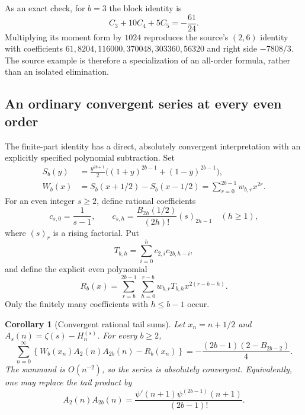 \documentclass[11pt,a4paper]{article}
\numberwithin{equation}{section}
\theoremstyle{plain}
\newtheorem{corollary}[theorem]{Corollary}
\theoremstyle{definition}
\theoremstyle{remark}
\begin{document}
As an exact check, for $b=3$ the block identity is
\[
 C_3+10C_4+5C_5=-\frac{61}{24}.
\]
Multiplying its moment form by $1024$ reproduces the source's
$(2,6)$ identity with coefficients
$61,8204,116000,370048,303360,56320$ and right side $-7808/3$.
The source example is therefore a specialization of an all-order
formula, rather than an isolated elimination.

\subsection{An ordinary convergent series at every even order}

The finite-part identity has a direct, absolutely convergent
interpretation with an explicitly specified polynomial subtraction.
Set
\begin{align}
 S_b(y)&=\frac{y^{2b+1}}2
       \bigl((1+y)^{2b-1}+(1-y)^{2b-1}\bigr),
       \label{eq:S-polynomial-two}\\
 W_b(x)&=S_b(x+1/2)-S_b(x-1/2)
        =\sum_{r=0}^{2b-1}w_{b,r}x^{2r}.
       \label{eq:W-polynomial-two}
\end{align}
For an even integer $s\geq2$, define rational coefficients
\[
 c_{s,0}=\frac1{s-1},\qquad
 c_{s,h}=\frac{B_{2h}(1/2)}{(2h)!}(s)_{2h-1}\quad(h\geq1),
\]
where $(s)_r$ is a rising factorial.  Put
\[
 T_{b,h}=\sum_{i=0}^hc_{2,i}c_{2b,h-i},
\]
and define the explicit even polynomial
\begin{equation}\label{eq:subtraction-two}
 R_b(x)=\sum_{r=b}^{2b-1}\ \sum_{h=0}^{r-b}
       w_{b,r}T_{b,h}x^{2(r-b-h)}.
\end{equation}
Only the finitely many coefficients with $h\leq b-1$ occur.

\begin{corollary}[Convergent rational tail sums]
\label{cor:ordinary-two}
Let $x_n=n+1/2$ and $A_s(n)=\zeta(s)-H_n^{(s)}$.  For every
$b\geq2$,
\begin{equation}\label{eq:ordinary-two}
 \sum_{n=0}^{\infty}
 \left\{W_b(x_n)A_2(n)A_{2b}(n)-R_b(x_n)\right\}
 =-\frac{(2b-1)(2-B_{2b-2})}{4}.
\end{equation}
The summand is $O(n^{-2})$, so the series is absolutely convergent.
Equivalently, one may replace the tail product by
\[
 A_2(n)A_{2b}(n)
 =\frac{\psi'(n+1)\psi^{(2b-1)}(n+1)}{(2b-1)!}.
\]
\end{corollary}
\end{document}
